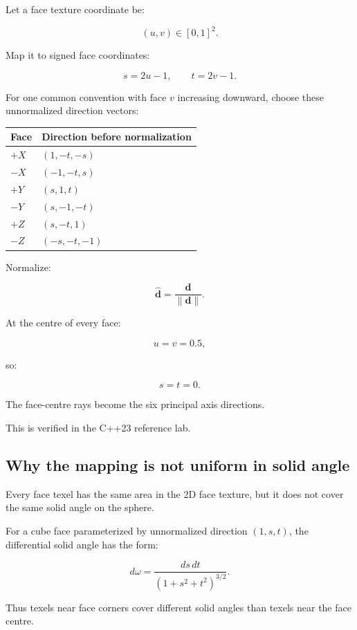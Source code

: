 Let a face texture coordinate be:

\[ (u,v)\in[0,1]^2. \]

Map it to signed face coordinates:

\[ s=2u-1, \qquad t=2v-1. \]

For one common convention with face \(v\) increasing downward, choose these unnormalized direction vectors:

{\def\LTcaptype{none} %
\begin{longtable}[]{@{}ll@{}}
\toprule\noalign{}
Face & Direction before normalization \\
\midrule\noalign{}
\endhead
\bottomrule\noalign{}
\endlastfoot
\(+X\) & \((1,-t,-s)\) \\
\(-X\) & \((-1,-t,s)\) \\
\(+Y\) & \((s,1,t)\) \\
\(-Y\) & \((s,-1,-t)\) \\
\(+Z\) & \((s,-t,1)\) \\
\(-Z\) & \((-s,-t,-1)\) \\
\end{longtable}
}

Normalize:

\[ \boxed{ \hat{\mathbf d}= \frac{\mathbf d}{\|\mathbf d\|}. } \]

At the centre of every face:

\[ u=v=0.5, \]

so:

\[ s=t=0. \]

The face-centre rays become the six principal axis directions.

This is verified in the C++23 reference lab.

\subsection{Why the mapping is not uniform in solid angle}\label{02-foundations-ii-ch035-why-the-mapping-is-not-uniform-in-solid-angle}

Every face texel has the same area in the 2D face texture, but it does not cover the same solid angle on the sphere.

For a cube face parameterized by unnormalized direction \((1,s,t)\), the differential solid angle has the form:

\[ \boxed{ d\omega= \frac{ds\,dt} {(1+s^2+t^2)^{3/2}}. } \]

Thus texels near face corners cover different solid angles than texels near the face centre.


